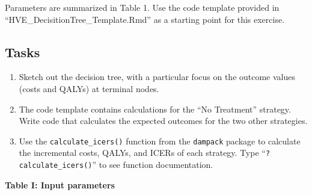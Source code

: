 \documentclass[
]{article}
\begin{document}
Parameters are summarized in Table 1. Use the code template provided in
``HVE\_DecisitionTree\_Template.Rmd'' as a starting point for this
exercise.

\hypertarget{tasks}{%
\subsection{Tasks}\label{tasks}}

\begin{enumerate}
\def\labelenumi{\arabic{enumi}.}
\item
  Sketch out the decision tree, with a particular focus on the outcome
  values (costs and QALYs) at terminal nodes.
\item
  The code template contains calculations for the ``No Treatment''
  strategy. Write code that calculates the expected outcomes for the two
  other strategies.
\item
  Use the \texttt{calculate\_icers()} function from the \texttt{dampack}
  package to calculate the incremental costs, QALYs, and ICERs of each
  strategy. Type ``\texttt{?calculate\_icers()}'' to see function
  documentation.
\end{enumerate}

\textbf{Table I: Input parameters}
\end{document}
